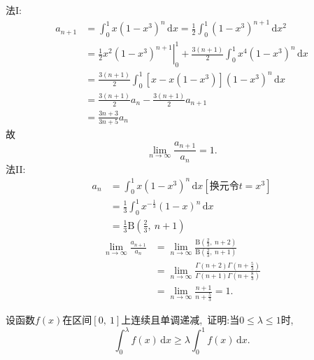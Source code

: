 	\begin{solution}
		法I:
		\begin{align*}
			a_{n+1}&=\int_{0}^{1}x(1-x^3)^n\,\text{d}x=\frac{1}{2}\int_{0}^{1}(1-x^3)^{n+1}\,\text{d}x^2\\
			&=\left.\frac{1}{2}x^2(1-x^3)^{n+1}\right|_{0}^{1}+\frac{3(n+1)}{2}\int_{0}^{1}x^4(1-x^3)^n\,\text{d}x\\
			&=\frac{3(n+1)}{2}\int_{0}^{1}[x-x(1-x^3)](1-x^3)^n\,\text{d}x\\
			&=\frac{3(n+1)}{2}a_n-\frac{3(n+1)}{2}a_{n+1}\\
			&=\frac{3n+3}{3n+5}a_n
		\end{align*}
		故
		$$\lim\limits_{n\rightarrow\infty}\frac{a_{n+1}}{a_n}=1.$$
		法II:
		\begin{align*}
			a_n&=\int_{0}^{1}x(1-x^3)^n\,\text{d}x\left[\text{换元令}t=x^3\right]\\
			&=\frac{1}{3}\int_{0}^{1}x^{-\frac{1}{3}}(1-x)^n\,\text{d}x\\
			&=\frac{1}{3}\mathrm {B}  \left(\frac{2}{3},\ n+1\right)
		\end{align*}
		\begin{align*}
			\lim\limits_{n\rightarrow\infty}\frac{a_{n+1}}{a_n}&=\lim\limits_{n\rightarrow\infty}\frac{\mathrm {B}  \left(\frac{2}{3},\ n+2\right)}{\mathrm {B}  \left(\frac{2}{3},\ n+1\right)}\\
			&=\lim\limits_{n\rightarrow\infty}\frac{\Gamma\left(n+2\right)\Gamma\left(n+\frac{5}{3}\right)}{\Gamma\left(n+1\right)\Gamma(n+\frac{8}{3})}\\
			&=\lim\limits_{n\rightarrow\infty}\frac{n+1}{n+\frac{5}{3}}=1.
		\end{align*}
	\end{solution}
	\newpage
	\begin{problem}
		设函数$f(x)$在区间$\left[0,\ 1\right]$上连续且单调递减,\ 证明:当$0\le \lambda\le 1$时,\ 
		$$\int_{0}^{\lambda}f(x)\,\text{d}x\ge \lambda\int_{0}^{1}f(x)\,\text{d}x.$$
	\end{problem}
	
